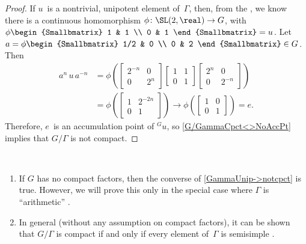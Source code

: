 \begin{proof}
 If $u$~is a nontrivial, unipotent element
of~$\Gamma$, then, from the 
, we know there is a continuous
homomorphism $\phi \colon \SL(2,\real) \to G$, with 
 $\phi 
 \begin{Smallbmatrix}
 1 & 1 \\
 0 & 1
 \end{Smallbmatrix}
 = u$.  
 Let 
 $ a = \phi 
 \begin{Smallbmatrix}
  1/2 & 0 \\
 0 & 2
 \end{Smallbmatrix}
 \in G $.
 Then
 \goodbreak %
 \begin{align*}
  a^{n} \, u \, a^{-n} 
 &= \phi 
 \left( 
 \begin{bmatrix}
 2^{-n} & 0 \\
 0 & 2^n
 \end{bmatrix}
 \begin{bmatrix}
 1 & 1 \\
 0 & 1
 \end{bmatrix}
 \begin{bmatrix}
 2^n & 0 \\
 0 & 2^{-n}
 \end{bmatrix}
 \right)
 \\&= 
 \phi
 \left( \begin{bmatrix}
 1 & 2^{-2n} \\
 0 & 1
 \end{bmatrix} \right)
 \to
 \phi
 \left( \begin{bmatrix}
 1 & 0 \\
 0 & 1
 \end{bmatrix} \right)
 = e .\end{align*}
 Therefore, $e$~is an accumulation point of ${}^G u$, so
\cref{G/GammaCpct<>NoAccPt} implies that $G/\Gamma$ is not compact.
 \end{proof}

\begin{rems} \  \label{GodementConverse}
\noprelistbreak
	\begin{enumerate}
	\item If $G$ has no compact factors, then the converse of
\cref{GammaUnip->notcpct} is true.
However, we will prove this only in the special case where $\Gamma$ is
``arithmetic'' .
	\item In general (without any assumption on compact factors), it can be shown that $G/\Gamma$ is compact if and only if every element of~$\Gamma$ is semisimple .
	\end{enumerate}
\end{rems}

